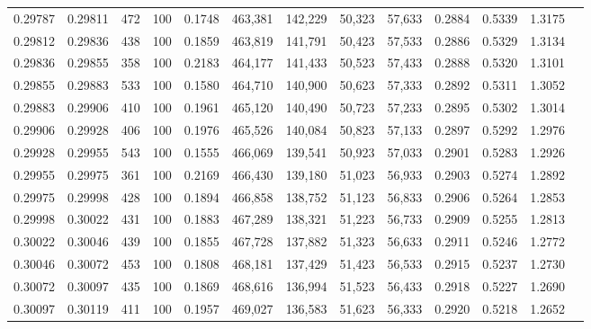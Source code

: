 \begin{tabular}{rrrrrrrrrrrrr}
0.29787 & 0.29811 &   472 & 100 &                                     0.1748 & 463,381 & 142,229 &  50,323 &  57,633 & 0.2884 & 0.5339 & 1.3175 \\
0.29812 & 0.29836 &   438 & 100 &                                     0.1859 & 463,819 & 141,791 &  50,423 &  57,533 & 0.2886 & 0.5329 & 1.3134 \\
0.29836 & 0.29855 &   358 & 100 &                                     0.2183 & 464,177 & 141,433 &  50,523 &  57,433 & 0.2888 & 0.5320 & 1.3101 \\
0.29855 & 0.29883 &   533 & 100 &                                     0.1580 & 464,710 & 140,900 &  50,623 &  57,333 & 0.2892 & 0.5311 & 1.3052 \\
0.29883 & 0.29906 &   410 & 100 &                                     0.1961 & 465,120 & 140,490 &  50,723 &  57,233 & 0.2895 & 0.5302 & 1.3014 \\
0.29906 & 0.29928 &   406 & 100 &                                     0.1976 & 465,526 & 140,084 &  50,823 &  57,133 & 0.2897 & 0.5292 & 1.2976 \\
0.29928 & 0.29955 &   543 & 100 &                                     0.1555 & 466,069 & 139,541 &  50,923 &  57,033 & 0.2901 & 0.5283 & 1.2926 \\
0.29955 & 0.29975 &   361 & 100 &                                     0.2169 & 466,430 & 139,180 &  51,023 &  56,933 & 0.2903 & 0.5274 & 1.2892 \\
0.29975 & 0.29998 &   428 & 100 &                                     0.1894 & 466,858 & 138,752 &  51,123 &  56,833 & 0.2906 & 0.5264 & 1.2853 \\
0.29998 & 0.30022 &   431 & 100 &                                     0.1883 & 467,289 & 138,321 &  51,223 &  56,733 & 0.2909 & 0.5255 & 1.2813 \\
0.30022 & 0.30046 &   439 & 100 &                                     0.1855 & 467,728 & 137,882 &  51,323 &  56,633 & 0.2911 & 0.5246 & 1.2772 \\
0.30046 & 0.30072 &   453 & 100 &                                     0.1808 & 468,181 & 137,429 &  51,423 &  56,533 & 0.2915 & 0.5237 & 1.2730 \\
0.30072 & 0.30097 &   435 & 100 &                                     0.1869 & 468,616 & 136,994 &  51,523 &  56,433 & 0.2918 & 0.5227 & 1.2690 \\
0.30097 & 0.30119 &   411 & 100 &                                     0.1957 & 469,027 & 136,583 &  51,623 &  56,333 & 0.2920 & 0.5218 & 1.2652 \\

\end{tabular}
